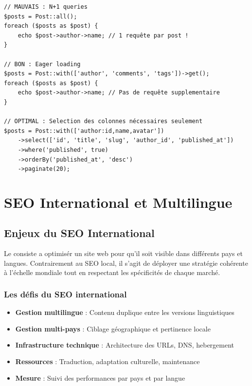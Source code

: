 \begin{lstlisting}[style=code,caption={Optimisation des requêtes N+1 avec Eloquent (Laravel)}]
// MAUVAIS : N+1 queries
$posts = Post::all();
foreach ($posts as $post) {
    echo $post->author->name; // 1 requête par post !
}

// BON : Eager loading
$posts = Post::with(['author', 'comments', 'tags'])->get();
foreach ($posts as $post) {
    echo $post->author->name; // Pas de requête supplementaire
}

// OPTIMAL : Selection des colonnes nécessaires seulement
$posts = Post::with(['author:id,name,avatar'])
    ->select(['id', 'title', 'slug', 'author_id', 'published_at'])
    ->where('published', true)
    ->orderBy('published_at', 'desc')
    ->paginate(20);
\end{lstlisting}


\chapter{SEO International et Multilingue}
\label{ch:international}

\section{Enjeux du SEO International}

Le  consiste a optimisér un site web pour qu'il soit visible dans différents pays et langues. Contrairement au SEO local, il s'agit de déployer une stratégie cohérente à l'échelle mondiale tout en respectant les spécificités de chaque marché.

\subsection{Les défis du SEO international}

\begin{itemize}
    \item \textbf{Gestion multilingue} : Contenu duplique entre les versions linguistiques
    \item \textbf{Gestion multi-pays} : Ciblage géographique et pertinence locale
    \item \textbf{Infrastructure technique} : Architecture des URLs, DNS, hebergement
    \item \textbf{Ressources} : Traduction, adaptation culturelle, maintenance
    \item \textbf{Mesure} : Suivi des performances par pays et par langue
\end{itemize}


